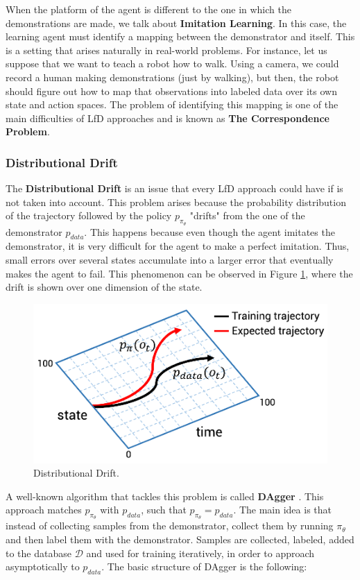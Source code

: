 When the platform of the agent is different to the one in which the demonstrations are made, we talk about \textbf{Imitation Learning}. In this case, the learning agent must identify a mapping between the demonstrator and itself. This is a setting that arises naturally in real-world problems. For instance, let us suppose that we want to teach a robot how to walk. Using a camera, we could record a human making demonstrations (just by walking), but then, the robot should figure out how to map that observations into labeled data over its own state and action spaces. The problem of identifying this mapping is one of the main difficulties of LfD approaches and is known as \textbf{The Correspondence Problem}.

\subsubsection{Distributional Drift}

The \textbf{Distributional Drift} is an issue that every LfD approach could have if is not taken into account. This problem arises because the probability distribution of the trajectory followed by the policy $p_{\pi_{\theta}}$ "drifts" from the one of the demonstrator $p_{data}$. This happens because even though the agent imitates the demonstrator, it is very difficult for the agent to make a perfect imitation. Thus, small errors over several states accumulate into a larger error that eventually makes the agent to fail. This phenomenon can be observed in Figure \ref{fig:drift}, where the drift is shown over one dimension of the state.

\begin{figure}[H]
    \centering
    \includegraphics[width=0.7\linewidth]{imagenes/cap1/drift.pdf}
    \caption{Distributional Drift.}
    \label{fig:drift}
\end{figure}

A well-known algorithm that tackles this problem is called \textbf{DAgger} \cite{ross2011reduction}. This approach matches $p_{\pi_{\theta}}$ with $p_{data}$, such that $p_{\pi_{\theta}} = p_{data}$. The main idea is that instead of collecting samples from the demonstrator, collect them by running $\pi_{\theta}$ and then label them with the demonstrator. Samples are collected, labeled, added to the database $\mathcal{D}$ and used for training iteratively, in order to approach asymptotically to $p_{data}$. The basic structure of DAgger is the following:

